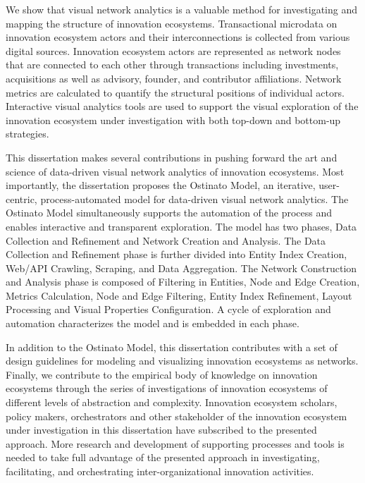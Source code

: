 We show that visual network analytics is a valuable method for investigating and mapping the structure of innovation ecosystems. Transactional microdata on innovation ecosystem actors and their interconnections is collected from various digital sources. Innovation ecosystem actors are represented as network nodes that are connected to each other through transactions including investments, acquisitions as well as advisory, founder, and contributor affiliations. Network metrics are calculated to quantify the structural positions of individual actors. Interactive visual analytics tools are used to support the visual exploration of the innovation ecosystem under investigation with both top-down and bottom-up strategies. 

This dissertation makes several contributions in pushing forward the art and science of data-driven visual network analytics of innovation ecosystems. Most importantly, the dissertation proposes the Ostinato Model, an iterative, user-centric, process-automated model for data-driven visual network analytics. The Ostinato Model simultaneously supports the automation of the process and enables interactive and transparent exploration. The model has two phases, Data Collection and Refinement and Network Creation and Analysis. The Data Collection and Refinement phase is further divided into Entity Index Creation, Web/API Crawling, Scraping, and Data Aggregation. The Network Construction and Analysis phase is composed of Filtering in Entities, Node and Edge Creation, Metrics Calculation, Node and Edge Filtering, Entity Index Refinement, Layout Processing and Visual Properties Configuration. A cycle of exploration and automation characterizes the model and is embedded in each phase.

In addition to the Ostinato Model, this dissertation contributes with a set of design guidelines for modeling and visualizing innovation ecosystems as networks. Finally, we contribute to the empirical body of knowledge on innovation ecosystems through the series of investigations of innovation ecosystems of different levels of abstraction and complexity. Innovation ecosystem scholars, policy makers, orchestrators and other stakeholder of the innovation ecosystem under investigation in this dissertation have subscribed to the presented approach. More research and development of supporting processes and tools is needed to take full advantage of the presented approach in investigating, facilitating, and orchestrating inter-organizational innovation activities.